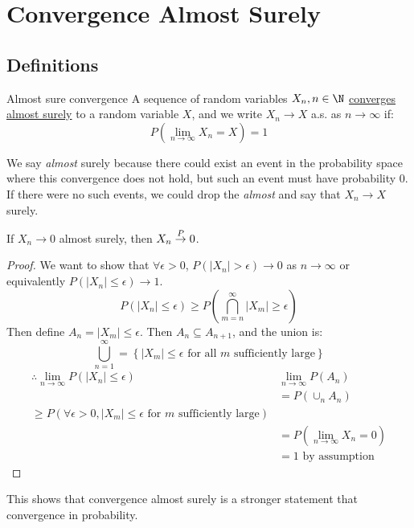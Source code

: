 \documentclass[../Main.tex]{subfiles}
\begin{document}
\section{Convergence Almost Surely}
\subsection{Definitions}
\begin{definition}{Almost sure convergence}
    A sequence of random variables $X_n, n \in \N$ \underline{converges almost surely} to a random variable $X$, and we write $X_n \to X$ a.s. as $n \to \infty$ if:
    \begin{equation*}
        P\left(\lim_{n \to \infty} X_n = X\right) = 1
    \end{equation*}
\end{definition}
\begin{remark}
    We say \textit{almost} surely because there could exist an event in the probability space where this convergence does not hold, but such an event must have probability 0. If there were no such events, we could drop the \textit{almost} and say that $X_n \to X$ surely.
\end{remark}
\begin{lemma}
    If $X_n \to 0$ almost surely, then $X_n \overset{P}{\rightarrow} 0$.
    \label{lemASConvergeImpliesProbCoverge}
\end{lemma}
\begin{proof}
    We want to show that $\forall \epsilon > 0$, $P(|X_n| > \epsilon) \to 0$ as $n \to \infty$ or equivalently $P(|X_n| \leq \epsilon) \to 1$.
    \begin{equation*}
        P(|X_n| \leq \epsilon) \geq P\left(\bigcap_{m = n}^\infty {|X_m| \geq \epsilon}\right)
    \end{equation*}
    Then define $A_n = {|X_m| \leq \epsilon}$. Then $A_n \subseteq A_{n + 1}$, and the union is:
    \begin{equation*}
        \bigcup_{n = 1}^\infty = \left\{|X_m| \leq \epsilon \text{ for all } m \text{ sufficiently large}\right\}
    \end{equation*}
    \begin{align*}
        \therefore \lim_{n \to \infty} P(|X_n| \leq \epsilon) &\lim_{n \to \infty} P(A_n) \\
        &= P\left(\cup_n A_n\right) \\
        \geq P(\forall \epsilon > 0, |X_m| \leq \epsilon \text{ for } m \text{ sufficiently large}) \\
        &= P(\lim_{n \to \infty} X_n = 0) \\
        &= 1 \text{ by assumption}
    \end{align*}
\end{proof}
\begin{remark}
    This shows that convergence almost surely is a stronger statement that convergence in probability.
\end{remark}
\end{document}
